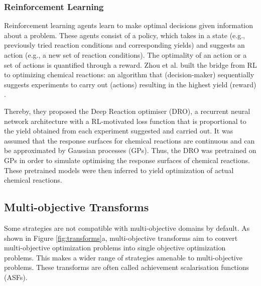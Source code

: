 \subsubsection{Reinforcement Learning}
Reinforcement learning agents learn to make optimal decisions given information about a problem.\cite{sutton2018reinforcement} These agents consist of a policy, which takes in a state (e.g., previously tried reaction conditions and corresponding yields) and suggests an action (e.g., a new set of reaction conditions). The optimality of an action or a set of actions is quantified through a reward. Zhou et al. built the bridge from RL to optimizing chemical reactions: an algorithm that (decision-maker) sequentially suggests experiments to carry out (actions) resulting in the highest yield (reward) \cite{Zhou2017}.

Thereby, they proposed the Deep Reaction optimiser (DRO), a recurrent neural network architecture with a RL-motivated loss function that is proportional to the yield obtained from each experiment suggested and carried out. It was assumed that the response surfaces for chemical reactions are continuous and can be approximated by Gaussian processes (GPs). Thus, the DRO was pretrained on GPs in order to simulate optimising the response surfaces of chemical reactions. These pretrained models were then inferred to yield optimization of actual chemical reactions.

\subsection{Multi-objective Transforms}

Some strategies are not compatible with multi-objective domains by default. As shown in Figure \ref{fig:transforms}a, multi-objective transforms aim to convert multi-objective optimization problems into single objective optimization problems. This makes a wider range of strategies amenable to multi-objective problems. These transforms are often called achievement scalarisation functions (ASFs).

        



